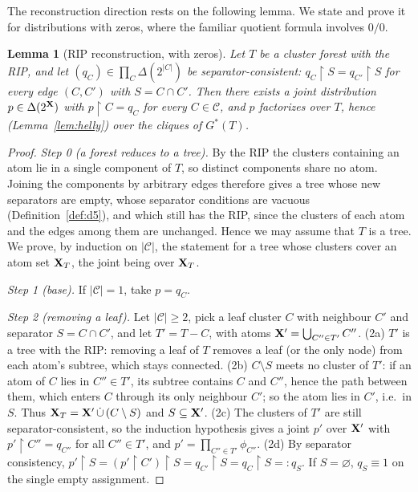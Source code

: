 \documentclass{article} %
\newtheorem{lemma}{Lemma}
\newcommand{\restr}{\!\restriction\!}
\begin{document}
The reconstruction direction rests on the following lemma. We state and prove
it for distributions with zeros, where the familiar quotient formula involves
$0/0$.

\begin{lemma}[RIP reconstruction, with zeros]\label{lem:rip}
Let $T$ be a cluster forest with the RIP, and let
$(q_C)\in\prod_C\Delta(2^{|C|})$ be separator-consistent: $q_C\restr S=q_{C'}\restr S$
for every edge $(C,C')$ with $S=C\cap C'$. Then there exists a joint distribution
$p\in\Delta(2^{\mathbf{X}})$ with $p\restr C=q_C$ for every $C\in\mathcal C$, and $p$
factorizes over $T$, hence (Lemma~\ref{lem:helly}) over the cliques of $G^\ast(T)$.
\end{lemma}

\begin{proof}
\emph{Step 0 (a forest reduces to a tree).} By the RIP the clusters containing an
atom lie in a single component of $T$, so distinct components share no atom.
Joining the components by arbitrary edges therefore gives a tree whose new
separators are empty, whose separator conditions are vacuous
(Definition~\ref{def:d5}), and which still has the RIP, since the clusters of each
atom and the edges among them are unchanged. Hence we may assume that $T$ is a
tree. We prove, by induction on $|\mathcal C|$, the statement for a tree whose
clusters cover an atom set $\mathbf{X}_T$, the joint being over $\mathbf{X}_T$.

\emph{Step 1 (base).} If $|\mathcal C|=1$, take $p=q_C$.

\emph{Step 2 (removing a leaf).} Let $|\mathcal C|\ge2$, pick a leaf cluster $C$
with neighbour $C'$ and separator $S=C\cap C'$, and let $T'=T-C$, with atoms
$\mathbf{X}'=\bigcup_{C''\in T'}C''$. (2a) $T'$ is a tree with the RIP: removing a leaf
of $T$ removes a leaf (or the only node) from each atom's subtree, which stays
connected. (2b) $C\setminus S$ meets no cluster of $T'$: if an atom of $C$ lies in
$C''\in T'$, its subtree contains $C$ and $C''$, hence the path between them,
which enters $C$ through its only neighbour $C'$; so the atom lies in $C'$, i.e.\ in
$S$. Thus $\mathbf{X}_T=\mathbf{X}'\,\dot\cup\,(C\setminus S)$ and $S\subseteq\mathbf{X}'$. (2c) The
clusters of $T'$ are still separator-consistent, so the induction hypothesis gives
a joint $p'$ over $\mathbf{X}'$ with $p'\restr C''=q_{C''}$ for all $C''\in T'$, and
$p'=\prod_{C''\in T'}\phi_{C''}$. (2d) By separator consistency,
$p'\restr S=(p'\restr C')\restr S=q_{C'}\restr S=q_C\restr S=:q_S$. If
$S=\varnothing$, $q_S\equiv1$ on the single empty assignment.


\end{proof}
\end{document}
